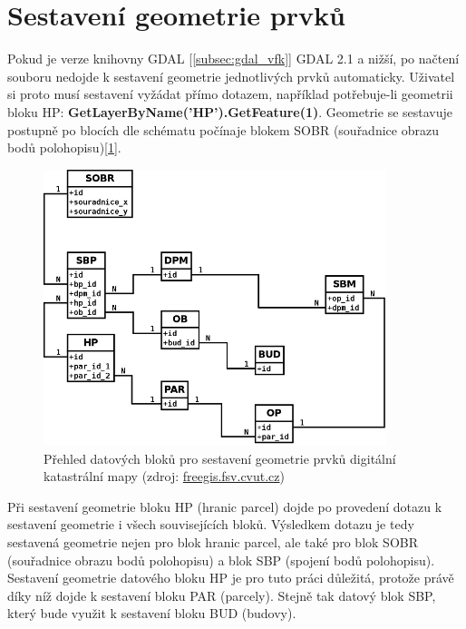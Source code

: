 \section{Sestavení geometrie prvků}
\label{sec:sestaveni_geometrie}
Pokud je verze knihovny GDAL [\ref{subsec:gdal_vfk}] GDAL 2.1 a nižší, po načtení  souboru nedojde k sestavení geometrie jednotlivých prvků automaticky. Uživatel si proto musí sestavení
vyžádat přímo dotazem, například potřebuje-li geometrii bloku HP:
\textbf{GetLayerByName('HP').GetFeature(1)}. Geo\-metrie se sestavuje
postupně po blocích dle schématu počínaje blokem SOBR (souřadnice
obrazu bodů polohopisu)[\ref{fig:vfk_diagram_geom}].
\begin{figure}[H]
	 \centering
      \includegraphics[width=10cm]{./pictures/Vfk-diagram-geom.png}
      \caption{Přehled datových bloků pro sestavení geometrie prvků digitální katastrální mapy (zdroj:
      \href{http://freegis.fsv.cvut.cz/wiki/images/thumb/8/8a/Vfk-diagram-geom.png/744px-Vfk-diagram-geom.png}{freegis.fsv.cvut.cz})}
      \label{fig:vfk_diagram_geom}
\end{figure}
Při sestavení geometrie bloku HP (hranic parcel) dojde po
provedení dotazu k sestavení geometrie i
všech souvisejících bloků. Výsledkem dotazu je tedy sestavená geometrie
nejen pro blok hranic parcel, ale také pro blok SOBR (souřadnice
obrazu bodů polohopisu) a blok SBP (spojení bodů
polohopisu). Sestavení geometrie datového bloku HP je pro tuto práci důležitá,
protože právě díky níž dojde k sestavení bloku PAR (parcely). Stejně tak
datový blok SBP, který bude využit k sestavení bloku BUD (budovy).
